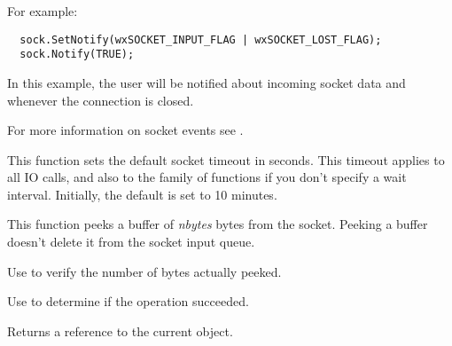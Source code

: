 \twocolwidtha{7cm}
\begin{twocollist}\itemsep=0pt
\end{twocollist}

For example:

\begin{verbatim}
  sock.SetNotify(wxSOCKET_INPUT_FLAG | wxSOCKET_LOST_FLAG);
  sock.Notify(TRUE);
\end{verbatim}

In this example, the user will be notified about incoming socket data and
whenever the connection is closed.

For more information on socket events see .

%
%
\label{wxsocketbasesettimeout}


This function sets the default socket timeout in seconds. This timeout
applies to all IO calls, and also to the 
family of functions if you don't specify a wait interval. Initially, the
default is set to 10 minutes.

%
%
\label{wxsocketbasepeek}


This function peeks a buffer of {\it nbytes} bytes from the socket.
Peeking a buffer doesn't delete it from the socket input queue.

Use  to verify the number of bytes actually peeked.

Use  to determine if the operation succeeded.





Returns a reference to the current object.


